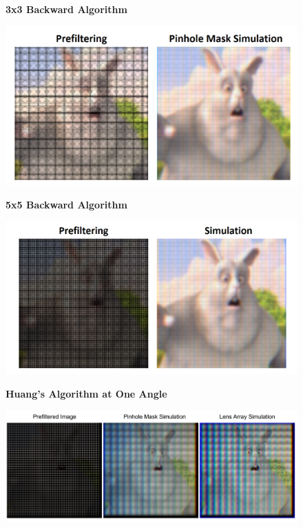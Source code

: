 \begin{figure}
    \centering
    \textbf{3x3 Backward Algorithm}\par\medskip
    \includegraphics[width=6in]{chapters/chapter9/images/3x3_backward.png}
\end{figure}

\begin{figure}
    \centering
    \textbf{5x5 Backward Algorithm}\par\medskip
    \includegraphics[width=6in]{chapters/chapter9/images/5x5_backward.png}
\end{figure}

\begin{figure}
    \centering
    \textbf{Huang's Algorithm at One Angle}\par\medskip
    \includegraphics[width=6in]{chapters/chapter9/images/Huang_1_angle.png}
\end{figure}

